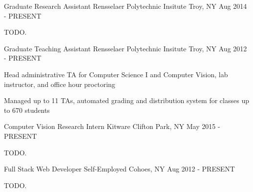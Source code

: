 

\begin{cventries}

  \cventry
    {Graduate Research Assistant} %
    {Rensselaer Polytechnic Insitute} %
    {Troy, NY} %
    {Aug 2014 - PRESENT} %
    {
      \begin{cvitems} %
        \item {TODO.}
      \end{cvitems}
    }

  \cventry
    {Graduate Teaching Assistant} %
    {Rensselaer Polytechnic Insitute} %
    {Troy, NY} %
    {Aug 2012 - PRESENT} %
    {
      \begin{cvitems} %
        \item {Head administrative TA for Computer Science I and Computer Vision, lab instructor, and office hour proctoring}
        \item {Managed up to 11 TAs, automated grading and distribution system for classes up to 670 students}
      \end{cvitems}
    }

  \cventry
    {Computer Vision Research Intern} %
    {Kitware} %
    {Clifton Park, NY} %
    {May 2015 - PRESENT} %
    {
      \begin{cvitems} %
        \item {TODO.}
      \end{cvitems}
    }

  \cventry
    {Full Stack Web Developer} %
    {Self-Employed} %
    {Cohoes, NY} %
    {Aug 2012 - PRESENT} %
    {
      \begin{cvitems} %
        \item {TODO.}
      \end{cvitems}
    }

\end{cventries}
